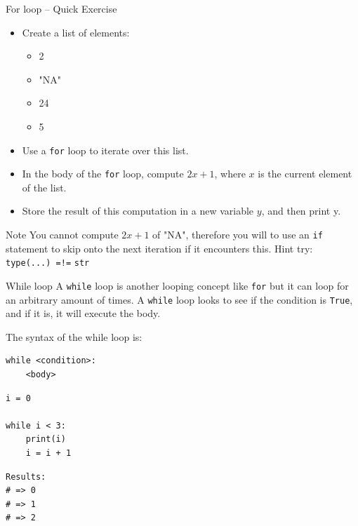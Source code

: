 \documentclass[10pt]{beamer}
\begin{document}
\begin{frame}[label={sec:org2fcdc48},fragile]{For loop -- Quick Exercise}
 \begin{itemize}
\item Create a list of elements:

\begin{itemize}
\item 2
\item "NA"
\item 24
\item 5
\end{itemize}

\item Use a \texttt{for} loop to iterate over this list.
\item In the body of the \texttt{for} loop, compute \(2x + 1\), where \(x\) is the current element of
the list.
\item Store the result of this computation in a new variable \(y\), and then print y.
\end{itemize}

\alert{Note} You cannot compute \(2x + 1\) of "NA", therefore you will to use an \texttt{if} statement
to skip onto the next iteration if it encounters this. \alert{Hint} try: \texttt{type(...) =!=} \texttt{str}
\end{frame}

\begin{frame}[label={sec:org94d35f0},fragile]{While loop}
 A \texttt{while} loop is another looping concept like \texttt{for} but it can loop for an arbitrary
amount of times. A \texttt{while} loop looks to see if the condition is \texttt{True}, and if it is, it
will execute the body.

The syntax of the while loop is:

\begin{verbatim}
while <condition>:
    <body>
\end{verbatim}

\begin{verbatim}
i = 0

while i < 3:
    print(i)
    i = i + 1
\end{verbatim}

\begin{verbatim}
Results: 
# => 0
# => 1
# => 2
\end{verbatim}
\end{frame}
\end{document}
